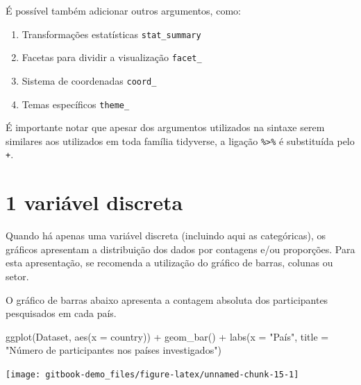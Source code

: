 \documentclass[
]{book}
\newenvironment{Shaded}{\begin{snugshade}}{\end{snugshade}}
\newcommand{\AttributeTok}[1]{\textcolor[rgb]{0.77,0.63,0.00}{#1}}
\newcommand{\FunctionTok}[1]{\textcolor[rgb]{0.00,0.00,0.00}{#1}}
\newcommand{\NormalTok}[1]{#1}
\newcommand{\SpecialCharTok}[1]{\textcolor[rgb]{0.00,0.00,0.00}{#1}}
\newcommand{\StringTok}[1]{\textcolor[rgb]{0.31,0.60,0.02}{#1}}
\providecommand{\tightlist}{%
  \setlength{\itemsep}{0pt}\setlength{\parskip}{0pt}}
\begin{document}
É possível também adicionar outros argumentos, como:

\begin{enumerate}
\def\labelenumi{\arabic{enumi}.}
\setcounter{enumi}{3}
\tightlist
\item
  Transformações estatísticas \texttt{stat\_summary}\\
\item
  Facetas para dividir a visualização \texttt{facet\_}\\
\item
  Sistema de coordenadas \texttt{coord\_}\\
\item
  Temas específicos \texttt{theme\_}
\end{enumerate}

É importante notar que apesar dos argumentos utilizados na sintaxe serem similares aos utilizados em toda família tidyverse, a ligação \texttt{\%\textgreater{}\%} é substituída pelo \texttt{+}.

\hypertarget{variuxe1vel-discreta}{%
\section{1 variável discreta}\label{variuxe1vel-discreta}}

Quando há apenas uma variável discreta (incluindo aqui as categóricas), os gráficos apresentam a distribuição dos dados por contagens e/ou proporções. Para esta apresentação, se recomenda a utilização do gráfico de barras, colunas ou setor.

O gráfico de barras abaixo apresenta a contagem absoluta dos participantes pesquisados em cada país.

\begin{Shaded}
\begin{Highlighting}[]
\FunctionTok{ggplot}\NormalTok{(Dataset, }\FunctionTok{aes}\NormalTok{(}\AttributeTok{x =}\NormalTok{ country)) }\SpecialCharTok{+}
  \FunctionTok{geom\_bar}\NormalTok{() }\SpecialCharTok{+}
  \FunctionTok{labs}\NormalTok{(}\AttributeTok{x =} \StringTok{"País"}\NormalTok{, }
       \AttributeTok{title =} \StringTok{"Número de participantes nos países investigados"}\NormalTok{)}
\end{Highlighting}
\end{Shaded}

\begin{center}\texttt{[image: gitbook-demo\_files/figure-latex/unnamed-chunk-15-1]} \end{center}
\end{document}

